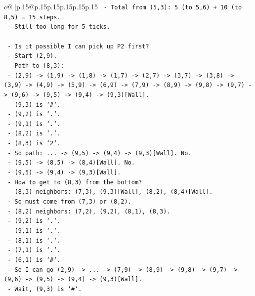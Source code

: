 \documentclass{article}
\begin{document}
{\begin{supertabular}{c@{$\;$}|p{.15\linewidth}@{}p{.15\linewidth}p{.15\linewidth}p{.15\linewidth}p{.15\linewidth}p{.15\linewidth}}
{{{\texttt{      {-} Total from (5,3): 5 (to 5,6) + 10 (to 8,5) = 15 steps.} \\
\texttt{      {-} Still too long for 5 ticks.} \\
\\ 
\texttt{      {-} Is it possible I can pick up P2 first?} \\
\texttt{      {-} Start (2,9).} \\
\texttt{      {-} Path to (8,3):} \\
\texttt{        {-} (2,9) {-}> (1,9) {-}> (1,8) {-}> (1,7) {-}> (2,7) {-}> (3,7) {-}> (3,8) {-}> (3,9) {-}> (4,9) {-}> (5,9) {-}> (6,9) {-}> (7,9) {-}> (8,9) {-}> (9,8) {-}> (9,7) {-}> (9,6) {-}> (9,5) {-}> (9,4) {-}> (9,3){[}Wall{]}.} \\
\texttt{        {-} (9,3) is `\#`.} \\
\texttt{        {-} (9,2) is `.`.} \\
\texttt{        {-} (9,1) is `.`.} \\
\texttt{        {-} (8,2) is `.`.} \\
\texttt{        {-} (8,3) is `2`.} \\
\texttt{        {-} So path: ... {-}> (9,5) {-}> (9,4) {-}> (9,3){[}Wall{]}. No.} \\
\texttt{        {-} (9,5) {-}> (8,5) {-}> (8,4){[}Wall{]}. No.} \\
\texttt{        {-} (9,5) {-}> (9,4) {-}> (9,3){[}Wall{]}.} \\
\texttt{        {-} How to get to (8,3) from the bottom?} \\
\texttt{        {-} (8,3) neighbors: (7,3), (9,3){[}Wall{]}, (8,2), (8,4){[}Wall{]}.} \\
\texttt{        {-} So must come from (7,3) or (8,2).} \\
\texttt{        {-} (8,2) neighbors: (7,2), (9,2), (8,1), (8,3).} \\
\texttt{        {-} (9,2) is `.`.} \\
\texttt{        {-} (9,1) is `.`.} \\
\texttt{        {-} (8,1) is `.`.} \\
\texttt{        {-} (7,1) is `.`.} \\
\texttt{        {-} (6,1) is `\#`.} \\
\texttt{        {-} So I can go (2,9) {-}> ... {-}> (7,9) {-}> (8,9) {-}> (9,8) {-}> (9,7) {-}> (9,6) {-}> (9,5) {-}> (9,4) {-}> (9,3){[}Wall{]}.} \\
\texttt{        {-} Wait, (9,3) is `\#`.} \\
}}}
\end{supertabular}}
\end{document}
